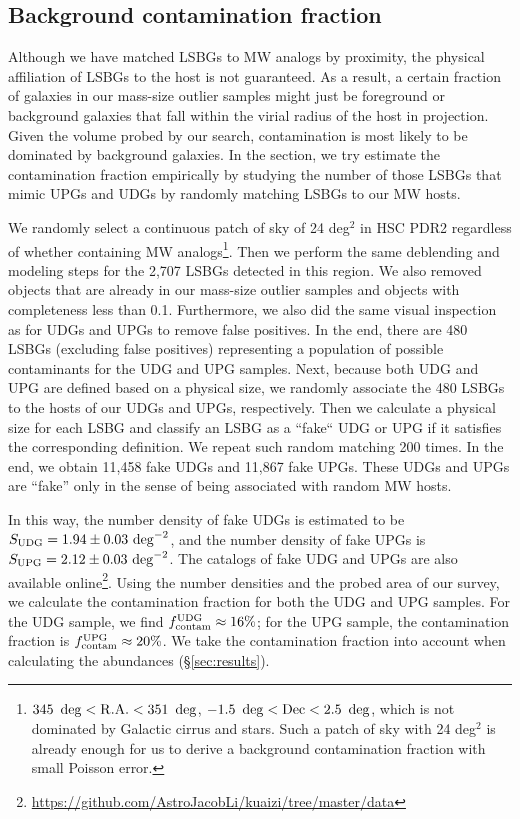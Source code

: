 \documentclass[twocolumn,astrosymb,twocolappendix]{aastex631}
\begin{document}
\begin{CJK*}{UTF8}{gbsn}
\subsection{Background contamination fraction}\label{sec:bkg}
Although we have matched LSBGs to MW analogs by proximity, the physical affiliation of LSBGs to the host is not guaranteed. As a result, a certain fraction of galaxies in our mass-size outlier samples might just be foreground or background galaxies that fall within the virial radius of the host in projection. Given the volume probed by our search, contamination is most likely to be dominated by background galaxies. In the section, we try estimate the contamination fraction empirically by studying the number of those LSBGs that mimic UPGs and UDGs by randomly matching LSBGs to our MW hosts.

We randomly select a continuous patch of sky of 24 deg$^{2}$ in HSC PDR2 regardless of whether containing MW analogs\footnote{$345\ \deg < \rm{R.A.} < 351\ \deg$, $-1.5\ \deg < \rm{Dec} < 2.5\ \deg$, which is not dominated by Galactic cirrus and stars. Such a patch of sky with 24 deg$^2$ is already enough for us to derive a background contamination fraction with small Poisson error.}. Then we perform the same deblending and modeling steps for the 2,707 LSBGs detected in this region. We also removed objects that are already in our mass-size outlier samples and objects with completeness less than 0.1. Furthermore, we also did the same visual inspection as for UDGs and UPGs to remove false positives. In the end, there are 480 LSBGs (excluding false positives) representing a population of possible contaminants for the UDG and UPG samples. Next, because both UDG and UPG are defined based on a physical size, we randomly associate the 480 LSBGs to the hosts of our UDGs and UPGs, respectively. Then we calculate a physical size for each LSBG and classify an LSBG as a ``fake`` UDG or UPG if it satisfies the corresponding definition. We repeat such random matching 200 times. In the end, we obtain 11,458 fake UDGs and 11,867 fake UPGs. These UDGs and UPGs are ``fake'' only in the sense of being associated with random MW hosts. 

In this way, the number density of fake UDGs is estimated to be $S_{\rm UDG} = 1.94\pm0.03\ \mathrm{deg}^{-2}$, and the number density of fake UPGs is $S_{\rm UPG} = 2.12\pm0.03\ \mathrm{deg}^{-2}$. The catalogs of fake UDG and UPGs are also available online\footnote{\url{https://github.com/AstroJacobLi/kuaizi/tree/master/data}}. Using the number densities and the probed area of our survey, we calculate the contamination fraction for both the UDG and UPG samples. For the UDG sample, we find $f_{\rm contam}^{\rm UDG} \approx 16\%$; for the UPG sample, the contamination fraction is $f_{\rm contam}^{\rm UPG} \approx 20\%$. We take the contamination fraction into account when calculating the abundances (\S\ref{sec:results}).


\end{CJK*}
\end{document}
